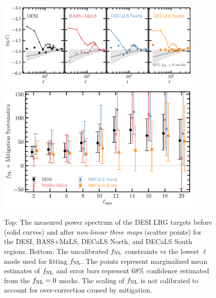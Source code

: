 \begin{figure}
    \centering
    \includegraphics[width=0.9\textwidth]{figures/cldr9_lowell.pdf}
    \includegraphics[width=0.9\textwidth]{figures/fnl_elmin.pdf}  
    \caption{Top: The measured power spectrum of the DESI LRG targets before (solid curves) and after \textit{non-linear three maps} (scatter points) for the DESI, BASS+MzLS, DECaLS North, and DECaLS South regions. Bottom: The uncalibrated $f_{\rm NL}$ constraints vs the lowest $\ell$ mode used for fitting $f_{\rm NL}$. The points represent marginalized mean estimates of $f_{\rm NL}$ and error bars represent $68$\% confidence estimated from the $f_{\rm NL}=0$ mocks. The scaling of $f_{\rm NL}$ is not calibrated to account for over-correction caused by mitigation.}\label{fig:mcmc_dr9elmin}
\end{figure}